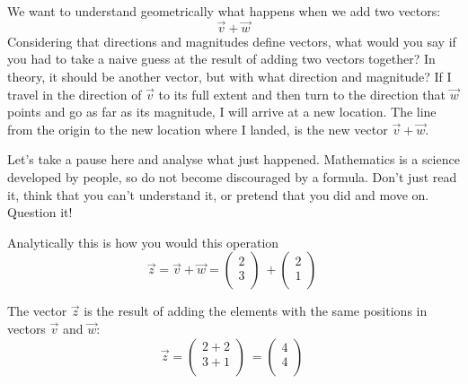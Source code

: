 \documentclass[600paper, 11pt,twoside,openany]{kdp}
\begin{document}
\indent We want to understand geometrically what happens when we add two vectors:
\[\overrightarrow{v} + \overrightarrow{w}\]
\indent Considering that directions and magnitudes define vectors, what would you say if you had to take a naive guess at the result of adding two vectors together? In theory, it should be another vector, but with what direction and magnitude? If I travel in the direction of $\overrightarrow{v}$ to its full extent and then turn to the direction that $\overrightarrow{w}$ points and go as far as its magnitude, I will arrive at a new location. The line from the origin to the new location where I landed, is the new vector $\overrightarrow{v} + \overrightarrow{w}$.
\par 
\vspace{-3pt}
\indent Let’s take a pause here and analyse what just happened. Mathematics is a science developed by people, so do not become discouraged by a formula. Don’t just read it, think that you can’t understand it, or pretend that you did and move on. Question it!
\par
Analytically this is how you would this operation
\[
\overrightarrow{z} = \overrightarrow{v} + \overrightarrow{w} = \begin{pmatrix}
 2\\
 3\\
\end{pmatrix}\ +
\begin{pmatrix}
 2\\
 1\\
\end{pmatrix}\
\]

\indent The vector $\overrightarrow{z}$ is the result of adding the elements with the same positions in vectors $\overrightarrow{v}$ and $\overrightarrow{w}$:
\[
\overrightarrow{z} = \begin{pmatrix}
 2 + 2\\
 3 + 1\\
\end{pmatrix}\ 
= \begin{pmatrix}
4\\
4\\
\end{pmatrix}\ 
\]
\end{document}
